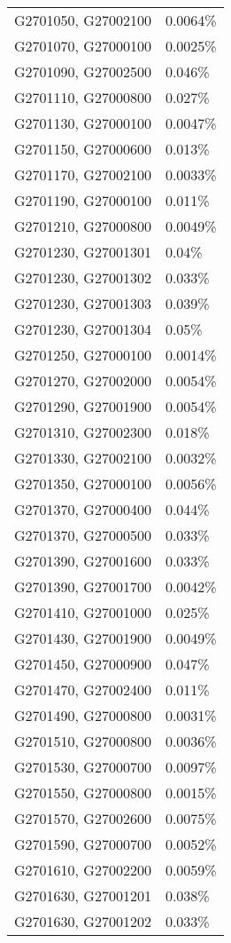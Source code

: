 \begin{longtable}[]{@{}ll@{}}
G2701050, G27002100 & 0.0064\% \\
G2701070, G27000100 & 0.0025\% \\
G2701090, G27002500 & 0.046\% \\
G2701110, G27000800 & 0.027\% \\
G2701130, G27000100 & 0.0047\% \\
G2701150, G27000600 & 0.013\% \\
G2701170, G27002100 & 0.0033\% \\
G2701190, G27000100 & 0.011\% \\
G2701210, G27000800 & 0.0049\% \\
G2701230, G27001301 & 0.04\% \\
G2701230, G27001302 & 0.033\% \\
G2701230, G27001303 & 0.039\% \\
G2701230, G27001304 & 0.05\% \\
G2701250, G27000100 & 0.0014\% \\
G2701270, G27002000 & 0.0054\% \\
G2701290, G27001900 & 0.0054\% \\
G2701310, G27002300 & 0.018\% \\
G2701330, G27002100 & 0.0032\% \\
G2701350, G27000100 & 0.0056\% \\
G2701370, G27000400 & 0.044\% \\
G2701370, G27000500 & 0.033\% \\
G2701390, G27001600 & 0.033\% \\
G2701390, G27001700 & 0.0042\% \\
G2701410, G27001000 & 0.025\% \\
G2701430, G27001900 & 0.0049\% \\
G2701450, G27000900 & 0.047\% \\
G2701470, G27002400 & 0.011\% \\
G2701490, G27000800 & 0.0031\% \\
G2701510, G27000800 & 0.0036\% \\
G2701530, G27000700 & 0.0097\% \\
G2701550, G27000800 & 0.0015\% \\
G2701570, G27002600 & 0.0075\% \\
G2701590, G27000700 & 0.0052\% \\
G2701610, G27002200 & 0.0059\% \\
G2701630, G27001201 & 0.038\% \\
G2701630, G27001202 & 0.033\% \\

\end{longtable}
